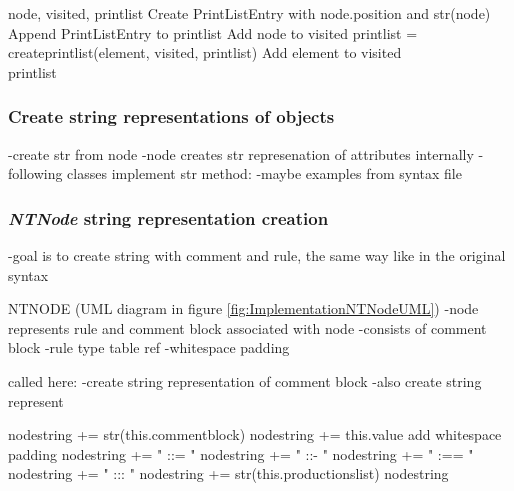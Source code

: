 \begin{algorithm}[H]
\caption{Output Algorithm: create\textunderscore print\textunderscore list}\label{alg:OutputCreatePrintList}
\begin{algorithmic}[1] 
\Require node, visited, print\textunderscore list
\State Create PrintListEntry with node.position and str(node)
\State Append PrintListEntry to print\textunderscore list
\State Add node to visited
			\State print\textunderscore list = create\textunderscore print\textunderscore list(element, visited, print\textunderscore list)
			\State Add element to visited
		\EndIf
	\EndFor
\EndFor \\
\Return print\textunderscore list
\end{algorithmic}
\end{algorithm}

\subsubsection{Create string representations of objects}\label{sec:ImplementationOutputGrammarGraphStringRepresentations}

-create str from node
-node creates str represenation of attributes internally
-following classes implement str method:
-maybe examples from syntax file

\subsubsection{\textit{NTNode} string representation creation}

-goal is to create string with comment and rule, the same way like in the original syntax

NTNODE (UML diagram in figure \ref{fig:ImplementationNTNodeUML})
-node represents rule and comment block associated with node
-consists of comment block
-rule type table ref
-whitespace padding

called here:
-create string representation of comment block
-also create string represent

\begin{algorithm}[H]
\caption{\textit{NTNode} string creation}\label{alg:OutputCreateNodeString}
\begin{algorithmic}[1] 
	\State node\textunderscore string += str(this.comment\textunderscore block)
\EndIf
\State node\textunderscore string += this.value
\State add whitespace padding
	\State node\textunderscore string += " ::= "
	\State node\textunderscore string += " ::- "
	\State node\textunderscore string += " :== "
	\State node\textunderscore string += " ::: "
\EndIf
\State node\textunderscore string += str(this.productions\textunderscore list)
\Return node\textunderscore string
\end{algorithmic}
\end{algorithm}


